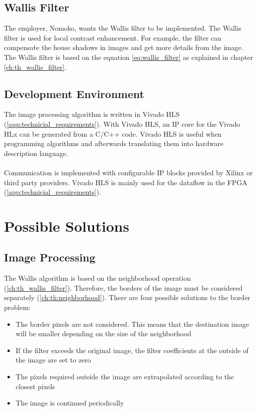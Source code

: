 \subsection{Wallis Filter} \label{chapt:mission:wallis}
The employer, Nomoko, wants the Wallis filter to be implemented. The Wallis filter is used for local contrast enhancement. For example, the filter can compensate the house shadows in images and get more details from the image. 
The Wallis filter is based on the equation \ref{eq:wallis_filter} as explained in chapter \ref{ch:th_wallis_filter}.


\subsection{Development Environment}
The image processing algorithm is written in Vivado HLS (\ref{app:technicial_requirements}). With Vivado HLS, an IP core for the Vivado HLx can be generated from a C/C++ code. Vivado HLS is useful when programming algorithms and afterwards translating them into hardware description language. \\ 
\\
Communication is implemented with configurable IP blocks provided by Xilinx or third party providers. Vivado HLS is mainly used for the dataflow in the FPGA (\ref{app:technicial_requirements}).

%
%
\section{Possible Solutions} \label{chapt:solutions}

\subsection{Image Processing} \label{chapt:mission:ip}
The Wallis algorithm is based on the neighborhood operation (\ref{ch:th_wallis_filter}). Therefore, the borders of the image must be considered separately (\ref{ch:th:neighborhood}). There are four possible solutions to the border problem:

\begin{itemize}
\item The border pixels are not considered. This means that the destination image will be smaller depending on the size of the neighborhood
\item If the filter exceeds the original image, the filter coefficients
at the outside of the image are set to zero
\item The pixels required outside the image are extrapolated according to the closest pixels
\item The image is continued periodically
\end{itemize}

